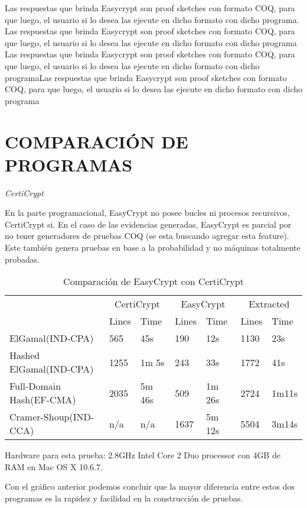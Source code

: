 \documentclass[runningheads,a4paper]{llncs}
\begin{document}
Las respuestas que brinda Easycrypt son proof sketches con formato COQ, para que luego, el usuario si lo desea las ejecute en dicho formato con dicho programa.\cite{article4}
Las respuestas que brinda Easycrypt son proof sketches con formato COQ, para que luego, el usuario si lo desea las ejecute en dicho formato con dicho programa
Las respuestas que brinda Easycrypt son proof sketches con formato COQ, para que luego, el usuario si lo desea las ejecute en dicho formato con dicho programaLas respuestas que brinda Easycrypt son proof sketches con formato COQ, para que luego, el usuario si lo desea las ejecute en dicho formato con dicho programa


\section{COMPARACIÓN DE PROGRAMAS}
\centerline{\emph{CertiCrypt}}
En la parte programacional, EasyCrypt no posee bucles ni procesos recursivos, CertiCrypt si. En el caso de las evidencias generadas, EasyCrypt es parcial por no tener generadores de pruebas COQ (se esta buscando agregar esta feature). Este también genera pruebas en base a la probabilidad y no máquinas totalmente probadas.

\begin{table}
  \caption{Comparación de EasyCrypt con CertiCrypt}
  \label{tab:simple1}
  \centering
  \begin{tabular}{ |p{3.5cm}|p{1.5cm}|p{1.5cm}|p{1.5cm}|p{1.5cm}|p{1.5cm}|p{1.5cm}|  }
 \hline
 & \multicolumn{2}{|c|}{CertiCrypt} & \multicolumn{2}{|c|}{EasyCrypt} & \multicolumn{2}{|c|}{Extracted} \\\cline{2-7}

 &Lines&Time&Lines&Time&Lines&Time\\\cline{2-7}
 \hline
 ElGamal(IND-CPA) & 565 & 45s & 190 & 12s & 1130 & 23s\\
 Hashed ElGamal(IND-CPA) & 1255  & 1m 5s & 243  & 33s & 1772 & 41s\\
 Full-Domain Hash(EF-CMA) & 2035 & 5m 46s&  509 & 1m 26s & 2724 & 1m11s\\
 Cramer-Shoup(IND-CCA) & n/a & n/a & 1637 & 5m 12s & 5504 & 3m14s\\
 \hline
\end{tabular}
\end{table}

Hardware para esta prueba: 2.8GHz Intel Core 2 Duo processor con 4GB de RAM en Mac OS X 10.6.7.\cite{article3}

Con el gráfico anterior podemos concluir que la mayor diferencia entre estos dos programas es la rapidez y facilidad en la construcción de pruebas.
\end{document}
